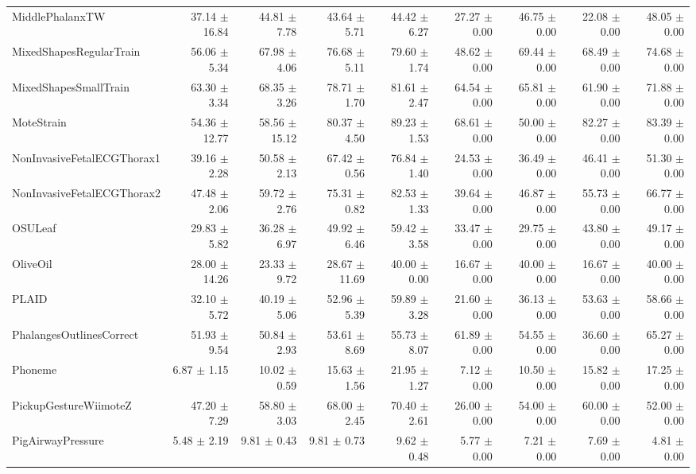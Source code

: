 \begin{landscape}
\begin{longtable}{lrrrrrrrr}
MiddlePhalanxTW & 37.14 $\pm$ 16.84 & 44.81 $\pm$ 7.78 & 43.64 $\pm$ 5.71 & 44.42 $\pm$ 6.27 & 27.27 $\pm$ 0.00 & 46.75 $\pm$ 0.00 & 22.08 $\pm$ 0.00 & 48.05 $\pm$ 0.00 \\
MixedShapesRegularTrain & 56.06 $\pm$ 5.34 & 67.98 $\pm$ 4.06 & 76.68 $\pm$ 5.11 & 79.60 $\pm$ 1.74 & 48.62 $\pm$ 0.00 & 69.44 $\pm$ 0.00 & 68.49 $\pm$ 0.00 & 74.68 $\pm$ 0.00 \\
MixedShapesSmallTrain & 63.30 $\pm$ 3.34 & 68.35 $\pm$ 3.26 & 78.71 $\pm$ 1.70 & 81.61 $\pm$ 2.47 & 64.54 $\pm$ 0.00 & 65.81 $\pm$ 0.00 & 61.90 $\pm$ 0.00 & 71.88 $\pm$ 0.00 \\
MoteStrain & 54.36 $\pm$ 12.77 & 58.56 $\pm$ 15.12 & 80.37 $\pm$ 4.50 & 89.23 $\pm$ 1.53 & 68.61 $\pm$ 0.00 & 50.00 $\pm$ 0.00 & 82.27 $\pm$ 0.00 & 83.39 $\pm$ 0.00 \\
NonInvasiveFetalECGThorax1 & 39.16 $\pm$ 2.28 & 50.58 $\pm$ 2.13 & 67.42 $\pm$ 0.56 & 76.84 $\pm$ 1.40 & 24.53 $\pm$ 0.00 & 36.49 $\pm$ 0.00 & 46.41 $\pm$ 0.00 & 51.30 $\pm$ 0.00 \\
NonInvasiveFetalECGThorax2 & 47.48 $\pm$ 2.06 & 59.72 $\pm$ 2.76 & 75.31 $\pm$ 0.82 & 82.53 $\pm$ 1.33 & 39.64 $\pm$ 0.00 & 46.87 $\pm$ 0.00 & 55.73 $\pm$ 0.00 & 66.77 $\pm$ 0.00 \\
OSULeaf & 29.83 $\pm$ 5.82 & 36.28 $\pm$ 6.97 & 49.92 $\pm$ 6.46 & 59.42 $\pm$ 3.58 & 33.47 $\pm$ 0.00 & 29.75 $\pm$ 0.00 & 43.80 $\pm$ 0.00 & 49.17 $\pm$ 0.00 \\
OliveOil & 28.00 $\pm$ 14.26 & 23.33 $\pm$ 9.72 & 28.67 $\pm$ 11.69 & 40.00 $\pm$ 0.00 & 16.67 $\pm$ 0.00 & 40.00 $\pm$ 0.00 & 16.67 $\pm$ 0.00 & 40.00 $\pm$ 0.00 \\
PLAID & 32.10 $\pm$ 5.72 & 40.19 $\pm$ 5.06 & 52.96 $\pm$ 5.39 & 59.89 $\pm$ 3.28 & 21.60 $\pm$ 0.00 & 36.13 $\pm$ 0.00 & 53.63 $\pm$ 0.00 & 58.66 $\pm$ 0.00 \\
PhalangesOutlinesCorrect & 51.93 $\pm$ 9.54 & 50.84 $\pm$ 2.93 & 53.61 $\pm$ 8.69 & 55.73 $\pm$ 8.07 & 61.89 $\pm$ 0.00 & 54.55 $\pm$ 0.00 & 36.60 $\pm$ 0.00 & 65.27 $\pm$ 0.00 \\
Phoneme & 6.87 $\pm$ 1.15 & 10.02 $\pm$ 0.59 & 15.63 $\pm$ 1.56 & 21.95 $\pm$ 1.27 & 7.12 $\pm$ 0.00 & 10.50 $\pm$ 0.00 & 15.82 $\pm$ 0.00 & 17.25 $\pm$ 0.00 \\
PickupGestureWiimoteZ & 47.20 $\pm$ 7.29 & 58.80 $\pm$ 3.03 & 68.00 $\pm$ 2.45 & 70.40 $\pm$ 2.61 & 26.00 $\pm$ 0.00 & 54.00 $\pm$ 0.00 & 60.00 $\pm$ 0.00 & 52.00 $\pm$ 0.00 \\
PigAirwayPressure & 5.48 $\pm$ 2.19 & 9.81 $\pm$ 0.43 & 9.81 $\pm$ 0.73 & 9.62 $\pm$ 0.48 & 5.77 $\pm$ 0.00 & 7.21 $\pm$ 0.00 & 7.69 $\pm$ 0.00 & 4.81 $\pm$ 0.00 \\

\end{longtable}
\end{landscape}
